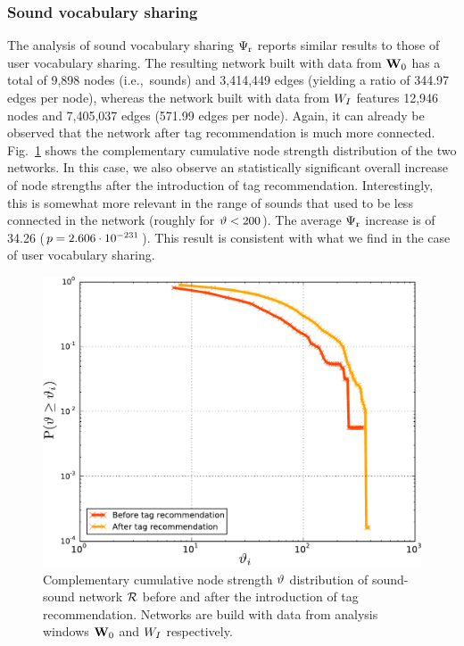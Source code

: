 \subsubsection{Sound vocabulary sharing}
The analysis of sound vocabulary sharing $\Psi_{\text{r}}$ reports similar results to those of user vocabulary sharing. The resulting network built with data from $\mathbf{W}_0$ has a total of 9,898 nodes (i.e.,~sounds) and 3,414,449 edges (yielding a ratio of 344.97 edges per node), whereas the network built with data from $W_I$ features 12,946 nodes and 7,405,037 edges (571.99 edges per node). Again, it can already be observed that the network after tag recommendation is much more connected. Fig.~\ref{impact:fig:sounds_graph_strength} shows the complementary cumulative node strength distribution of the two networks. In this case, we also observe an statistically significant overall increase of node strengths after the introduction of tag recommendation. Interestingly, this is somewhat more relevant in the range of sounds that used to be less connected in the network (roughly for $\vartheta < 200$). The average $\Psi_{\text{r}}$ increase is of 34.26 ($p = 2.606\cdot 10^{-231}$). This result is consistent with what we find in the case of user vocabulary sharing.

\begin{figure}
\centerline{\includegraphics[width=0.66\columnwidth]{ch05_impact/pics/fig08_sounds_graph_strength}}
\caption[Complementary cumulative node strength distribution of sound-sound network]{
Complementary cumulative node strength $\vartheta$ distribution of sound-sound network $\mathcal{R}$ before and after the introduction of tag recommendation. Networks are build with data from analysis windows $\mathbf{W}_0$ and $W_I$ respectively.}
\label{impact:fig:sounds_graph_strength}
\end{figure}


